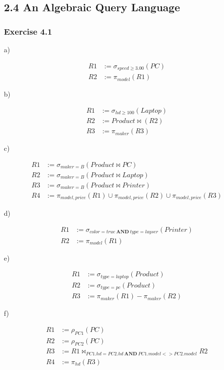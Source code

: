 \documentclass[../../main.tex]{subfiles}
\begin{document}
\subsection*{2.4 An Algebraic Query Language}

\subsubsection*{Exercise 4.1}

a)

\begin{align*}
  R1 &:= \sigma_{speed \geq 3.00}(PC) \\
  R2 &:= \pi_{model}(R1)
\end{align*}

b)

\begin{align*}
  R1 &:= \sigma_{hd \geq 100}(Laptop) \\
  R2 &:= Product \bowtie (R2) \\
  R3 &:= \pi_{maker}(R3)
\end{align*}

c)

\begin{align*}
  R1 &:= \sigma_{maker=B}(Product \bowtie PC) \\
  R2 &:= \sigma_{maker=B}(Product \bowtie Laptop) \\
  R3 &:= \sigma_{maker=B}(Product \bowtie Printer) \\
  R4 &:= \pi_{model, price}(R1) \cup \pi_{model, price}(R2)
         \cup \pi_{model, price}(R3)
\end{align*}

d)

\begin{align*}
  R1 &:= \sigma_{color=true \ \mathbf{AND} \ type=layser}(Printer) \\
  R2 &:= \pi_{model}(R1)
\end{align*}

e)

\begin{align*}
  R1 &:= \sigma_{type=laptop}(Product) \\
  R2 &:= \sigma_{type=pc}(Product) \\
  R3 &:= \pi_{maker}(R1) - \pi_{maker}(R2)
\end{align*}

f)

\begin{align*}
  R1 &:= \rho_{PC1}(PC) \\
  R2 &:= \rho_{PC2}(PC) \\
  R3 &:= R1 \bowtie_{PC1.hd = PC2.hd \ \mathbf{AND} \ PC1.model <> PC2.model} R2 \\
  R4 &:= \pi_{hd}(R3)
\end{align*}
\end{document}
